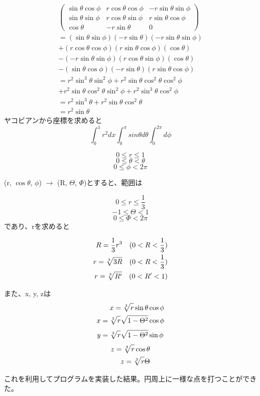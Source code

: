 \documentclass[dvipdfmx,autodetect-engine,twocolumn,10pt]{jsarticle}%
\begin{document}
\begin{eqnarray*}
\displaystyle
\begin{pmatrix}
\sin{\theta}\cos{\phi} & r\cos{\theta}\cos{\phi} & -r\sin{\theta}\sin{\phi} \\
\sin{\theta}\sin{\phi} & r\cos{\theta}\sin{\phi} & r\sin{\theta}\cos{\phi} \\
\cos{\theta} & -r\sin{\theta} & 0 \end{pmatrix} \\
=(\sin{\theta}\sin{\phi})(-r\sin{\theta})(-r\sin{\theta}\sin{\phi})\\+(r\cos{\theta}\cos{\phi})(r\sin{\theta}\cos{\phi})(\cos{\theta}) \\-(-r\sin{\theta}\sin{\phi})(r\cos{\theta}\sin{\phi})(\cos{\theta})\\-(\sin{\theta}\cos{\phi})(-r\sin{\theta})(r\sin{\theta}\cos{\phi}) \\
=r^2\sin^3{\theta}\sin^2{\phi}+r^2\sin{\theta}\cos^2{\theta}\cos^2{\phi}\\+r^2\sin{\theta}\cos^2{\theta}\sin^2{\phi}+r^2\sin^3{\theta}\cos^2{\phi} \\=r^2\sin^3{\theta}+r^2\sin{\theta}\cos^2{\theta} \\
=r^2\sin{\theta}
 \end{eqnarray*}
ヤコビアンから座標を求めると\\

\begin{equation}
\int_0^1 r^2 dx\int_0^\pi sin\theta d\theta \int_0^{2\pi} d\phi
\nonumber
\end{equation}

\[0 \leq r \leq 1 \]
\[0 \leq \theta < \theta \]
\[0 \leq \phi < 2\pi \]

(r, \(\cos \theta \), \(\phi \)) \(\rightarrow \) (R, \(\Theta \), \(\Phi \))とすると、範囲は


\[0 \leq r \leq \frac{1}{3} \]
\[-1 \leq \Theta < 1 \]
\[0 \leq \Phi < 2\pi \]
であり、rを求めると

\begin{eqnarray*}
R = \frac{1}{3} r^3 \quad (0 < R < \frac{1}{3}) \\
r = \sqrt[3]{\mathstrut 3R}  \quad (0 < R < \frac{1}{3}) \\
r = \sqrt[3]{\mathstrut R'}  \quad (0 < R' < 1)
\end{eqnarray*}

また、x, y, zは
\begin{eqnarray*}
x = \sqrt[3]{\mathstrut r}\sin \theta \cos \phi \\
x = \sqrt[3]{\mathstrut r}\sqrt{1 - \Theta ^2} \cos \phi \\
\end{eqnarray*}
\begin{eqnarray*}
y = \sqrt[3]{\mathstrut r}\sqrt{1 - \Theta ^2} \sin \phi \\
\end{eqnarray*}
\begin{eqnarray*}
z = \sqrt[3]{\mathstrut r}\cos \theta \\
z = \sqrt[3]{\mathstrut r}\Theta
\end{eqnarray*}

これを利用してプログラムを実装した結果。円周上に一様な点を打つことができた。
\end{document}
